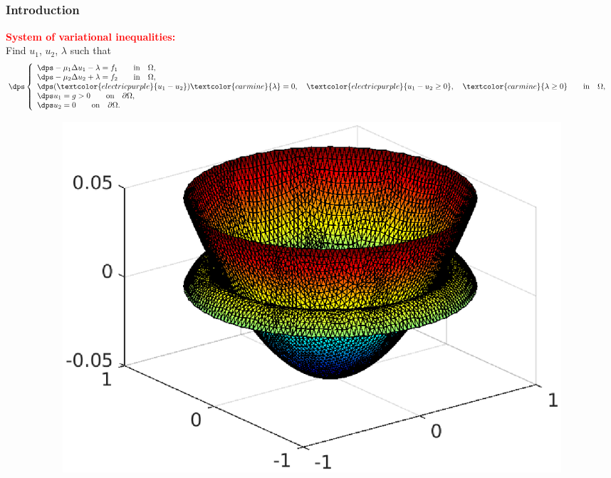 \documentclass{beamer}
\begin{document}
\subsection{}
\begin{frame}[t]
\frametitle{Introduction}
\vspace*{-0.3 cm}
\textcolor{red}{\textbf{System of variational inequalities:}}\\
\vspace*{0.2 cm}
Find $u_1$, $u_2$, $\lambda$ such that
\begin{equation*}
\dps
\left\lbrace\begin{array}{llccc}
\dps -\mu_1 \Delta u_1-\lambda = f_1 \qquad \mbox{in} \quad \Omega, \\
\dps -\mu_2 \Delta u_2+\lambda = f_2 \qquad \mbox{in} \quad \Omega,\\
\dps (\textcolor{electricpurple}{u_1-u_2})\textcolor{carmine}{\lambda}=0, \quad \textcolor{electricpurple}{u_1-u_2 \geq 0}, \quad 
\textcolor{carmine}{\lambda \geq 0} \qquad \mbox{in} \quad \Omega, \hspace{0.2 cm}\\
\dps u_1=g > 0 \qquad \mbox{on} \quad\partial \Omega,\\
\dps u_2=0 \qquad \mbox{on} \quad\partial \Omega.
\end{array}
\right.
\end{equation*}
\vspace{-0.7cm}
\begin{figure}[t]
\begin{subfigure}[normal]{0.46\textwidth} 
\includegraphics[width=\textwidth]{fig_article/fig_membrane_cv.eps}    

\end{subfigure}
\end{figure}
\end{frame}
\end{document}
